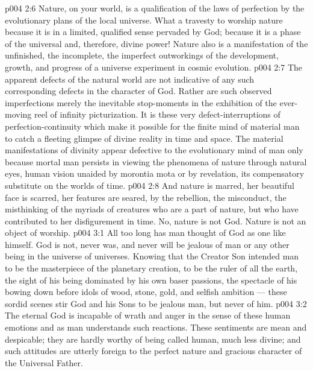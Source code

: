 \vs p004 2:6 Nature, on your world, is a qualification of the laws of perfection by the evolutionary plans of the local universe. What a travesty to worship nature because it is in a limited, qualified sense pervaded by God; because it is a phase of the universal and, therefore, divine power! Nature also is a manifestation of the unfinished, the incomplete, the imperfect outworkings of the development, growth, and progress of a universe experiment in cosmic evolution.
\vs p004 2:7 The apparent defects of the natural world are not indicative of any such corresponding defects in the character of God. Rather are such observed imperfections merely the inevitable stop\hyp{}moments in the exhibition of the ever\hyp{}moving reel of infinity picturization. It is these very defect\hyp{}interruptions of perfection\hyp{}continuity which make it possible for the finite mind of material man to catch a fleeting glimpse of divine reality in time and space. The material manifestations of divinity appear defective to the evolutionary mind of man only because mortal man persists in viewing the phenomena of nature through natural eyes, human vision unaided by morontia mota or by revelation, its compensatory substitute on the worlds of time.
\vs p004 2:8 And nature is marred, her beautiful face is scarred, her features are seared, by the rebellion, the misconduct, the misthinking of the myriads of creatures who are a part of nature, but who have contributed to her disfigurement in time. No, nature is not God. Nature is not an object of worship.
\vs p004 3:1 All too long has man thought of God as one like himself. God is not, never was, and never will be jealous of man or any other being in the universe of universes. Knowing that the Creator Son intended man to be the masterpiece of the planetary creation, to be the ruler of all the earth, the sight of his being dominated by his own baser passions, the spectacle of his bowing down before idols of wood, stone, gold, and selfish ambition --- these sordid scenes stir God and his Sons to be jealous  man, but never of him.
\vs p004 3:2 The eternal God is incapable of wrath and anger in the sense of these human emotions and as man understands such reactions. These sentiments are mean and despicable; they are hardly worthy of being called human, much less divine; and such attitudes are utterly foreign to the perfect nature and gracious character of the Universal Father.
